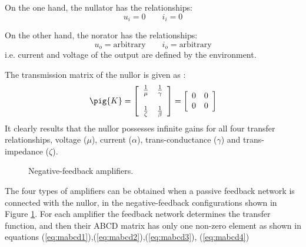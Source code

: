 \documentclass{ecctd01}
\begin{document}
On the one hand, the nullator has the relationships:
\begin{displaymath}
u_i=0 \qquad i_i=0
\end{displaymath}

On the other hand, the norator has the relationships:
\begin{displaymath}
u_o= \mbox{arbitrary} \qquad i_o= \mbox{arbitrary}
\end{displaymath}
i.e. current and voltage of the output are defined by the
environment.

The transmission matrix of the nullor is given as \cite{carlin,moschytz}:
\begin{equation}\label{eq:abcd}
\pig{K}
=
\left [ \begin{array}{cc}
\frac{1}{\mu}& \frac{1}{\gamma} \\\\
\frac{1}{\zeta}& \frac{1}{\beta}
\end{array}
\right ]
=
\left [ \begin{array}{cc}
0 & 0 \\ 0 & 0
\end{array}
\right ]
\end{equation}
It clearly results that the nullor possesses infinite gains for all four
transfer relationships, voltage ($\mu$), current ($\alpha$),
trans-conductance ($\gamma$) and trans-impedance ($\zeta$).

\begin{figure}[hbtp]
\centerline{
\epsfxsize=78mm
}
\caption{Negative-feedback amplifiers.}
\label{figure2}
\end{figure} 

The four types of amplifiers can be obtained when a passive feedback
network is connected with the nullor, in the negative-feedback
configurations shown in
Figure \ref{figure2}.
For each amplifier the feedback network determines the transfer function,
and then their ABCD matrix has only one non-zero element as shown
in equations (\ref{eq:mabcd1}),(\ref{eq:mabcd2}),(\ref{eq:mabcd3}),
(\ref{eq:mabcd4})
\end{document}
